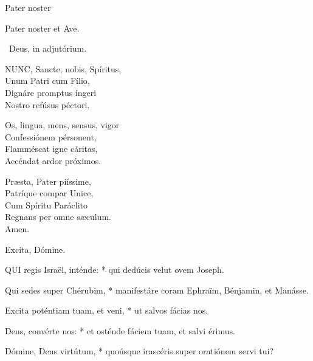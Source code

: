  Pater noster 


Pater noster et Ave.

\V\ Deus, in adjutórium.


\lettrine[lines=2]{N}{UNC}, Sancte, nobis, Spíritus,\\
Unum Patri cum Fílio,\\
Dignáre promptus íngeri\\
Nostro refúsus péctori.

Os, lingua, mens, sensus, vigor\\
Confessiónem pérsonent,\\
Flamméscat igne cáritas,\\
Accéndat ardor próximos.

Præsta, Pater piíssime,\\
Patríque compar Unice,\\
Cum Spíritu Paráclito\\
Regnans per omne sæculum.\\
Amen.

 Excita, Dómine.


\lettrine[lines=2]{Q}{UI} regis Israël, inténde: * qui dedúcis velut ovem Joseph.

Qui sedes super Chérubim, * manifestáre coram Ephraïm, Bénjamin, et Manásse.

Excita poténtiam tuam, et veni, * ut salvos fácias nos.

Deus, convérte nos: * et osténde fáciem tuam, et salvi érimus.

Dómine, Deus virtútum, * quoúsque irascéris super oratiónem servi tui?

